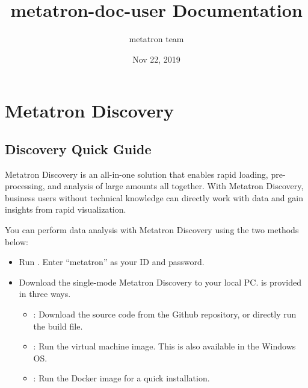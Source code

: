\documentclass[letterpaper,10pt,english]{sphinxmanual}
\title{metatron-doc-user Documentation}
\date{Nov 22, 2019}
\author{metatron team}
\begin{document}
\pagestyle{empty}
\sphinxmaketitle
\pagestyle{plain}
\sphinxtableofcontents
\pagestyle{normal}
\label{\detokenize{index::doc}}



\part{Metatron Discovery}
\label{\detokenize{index:metatron-discovery}}

\chapter{Discovery Quick Guide}
\label{\detokenize{discovery/part00/index:id1}}\label{\detokenize{discovery/part00/index::doc}}
Metatron Discovery is an all-in-one solution that enables rapid loading, pre-processing, and analysis of large amounts all together. With Metatron Discovery, business users without technical knowledge can directly work with data and gain insights from rapid visualization.

You can perform data analysis with Metatron Discovery using the two methods below:
\begin{itemize}
\item {} 
 Run . Enter “metatron” as your ID and password.

\item {} 
 Download the single-mode Metatron Discovery to your local PC.  is provided in three ways.
\begin{itemize}
\item {} 
: Download the source code from the Github repository, or directly run the build file.

\item {} 
: Run the virtual machine image. This is also available in the Windows OS.

\item {} 
: Run the Docker image for a quick installation.

\end{itemize}

\end{itemize}
\end{document}
